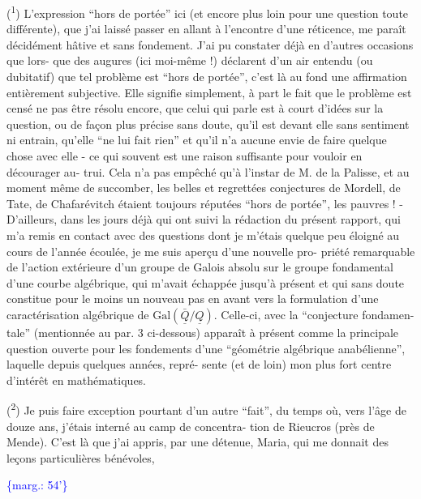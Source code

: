 \documentclass[11pt]{article}
\newcommand{\scanpage}[1]{\par\bigskip\noindent{\small\sffamily[scan #1]}\par}
\newcommand{\mspage}[1]{{\small\sffamily[p.\,#1]}}
\newcommand{\margin}[1]{\textcolor{blue}{\{\textsf{marg.:} #1\}}}
\begin{document}
(\textsuperscript{1}) L'expression ``hors de portée'' ici (et encore plus loin pour
une question toute différente), que j'ai laissé passer en allant
à l'encontre d'une réticence, me paraît décidément hâtive et sans
fondement. J'ai pu constater déjà en d'autres occasions que lors-%
que des augures (ici moi-même !) déclarent d'un air entendu
(ou dubitatif) que tel problème est ``hors de portée'', c'est là
au fond une affirmation entièrement subjective. Elle signifie
simplement, à part le fait que le problème est censé ne pas être
résolu encore, que celui qui parle est à court d'idées sur la
question, ou de façon plus précise sans doute, qu'il est devant
elle sans sentiment ni entrain, qu'elle ``ne lui fait rien'' et
qu'il n'a aucune envie de faire quelque chose avec elle - ce qui
souvent est une raison suffisante pour vouloir en décourager au-%
trui. Cela n'a pas empêché qu'à l'instar de M. de la Palisse, et
au moment même de succomber, les belles et regrettées conjectures
de Mordell, de Tate, de Chafarévitch étaient toujours réputées
``hors de portée'', les pauvres ! - D'ailleurs, dans les jours déjà
qui ont suivi la rédaction du présent rapport, qui m'a remis en
contact avec des questions dont je m'étais quelque peu éloigné au
cours de l'année écoulée, je me suis aperçu d'une nouvelle pro-%
priété remarquable de l'action extérieure d'un groupe de Galois
absolu sur le groupe fondamental d'une courbe algébrique, qui m'avait
échappée jusqu'à présent et qui sans doute constitue pour le moins
un nouveau pas en avant vers la formulation d'une caractérisation
algébrique de $\mathrm{Gal}(\bar{\underline{Q}}/\underline{Q})$. Celle-ci, avec la ``conjecture fondamen-%
tale'' (mentionnée au par. 3 ci-dessous) apparaît à présent comme
la principale question ouverte pour les fondements d'une ``géométrie
algébrique anabélienne'', laquelle depuis quelques années, repré-%
sente (et de loin) mon plus fort centre d'intérêt en mathématiques.

(\textsuperscript{2}) Je puis faire exception pourtant d'un autre ``fait'', du temps
où, vers l'âge de douze ans, j'étais interné au camp de concentra-%
tion de Rieucros (près de Mende). C'est là que j'ai appris, par une
détenue, Maria, qui me donnait des leçons particulières bénévoles,

\margin{54'}

\clearpage
\scanpage{119/55}
\mspage{53}
\end{document}
